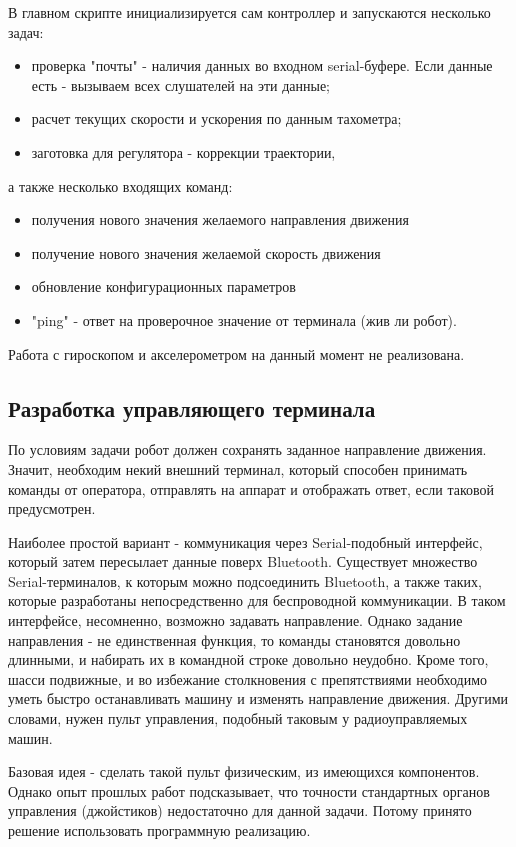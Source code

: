\documentclass[14pt,a4paper,russian]{scrartcl}
\begin{document}
В главном скрипте инициализируется сам контроллер и запускаются несколько задач:
\begin{itemize}
    \item проверка "почты" - наличия данных во входном serial-буфере. Если данные
    есть - вызываем всех слушателей на эти данные;
    \item расчет текущих скорости и ускорения по данным тахометра;
    \item заготовка для регулятора - коррекции траектории,
\end{itemize}
а также несколько входящих команд:
\begin{itemize}
    \item получения нового значения желаемого направления движения
    \item получение нового значения желаемой скорость движения
    \item обновление конфигурационных параметров
    \item "ping" - ответ на проверочное значение от терминала (жив ли робот).
\end{itemize}

Работа с гироскопом и акселерометром на данный момент не реализована.

\subsection{Разработка управляющего терминала}
По условиям задачи робот должен сохранять заданное направление движения.
Значит, необходим некий внешний терминал, который способен
принимать команды от оператора, отправлять на аппарат и отображать
ответ, если таковой предусмотрен.

Наиболее простой вариант - коммуникация через Serial-подобный интерфейс,
который затем пересылает данные поверх Bluetooth. Существует множество
Serial-терминалов, к которым можно подсоединить Bluetooth, а также таких,
которые разработаны непосредственно для беспроводной коммуникации.
В таком интерфейсе, несомненно, возможно задавать направление. Однако задание
направления - не единственная функция, то команды становятся довольно длинными,
и набирать их в командной строке довольно неудобно. Кроме того,
шасси подвижные, и во избежание столкновения с препятствиями необходимо уметь
быстро останавливать машину и изменять направление движения. Другими 
словами, нужен пульт управления, подобный таковым у радиоуправляемых машин.

Базовая идея - сделать такой пульт физическим, из имеющихся компонентов.
Однако опыт прошлых работ подсказывает, что точности стандартных
органов управления (джойстиков) недостаточно для данной задачи.
Потому принято решение использовать программную реализацию.
\end{document}
